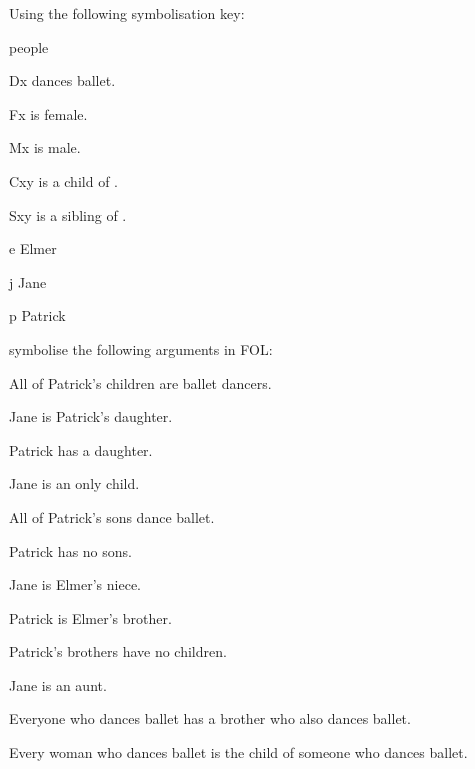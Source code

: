 \problempart
\label{pr.FOLballet}
Using the following symbolisation key:
\begin{ekey}
\item[\text{domain}] people
\item[Dx]  dances ballet.
\item[Fx]  is female.
\item[Mx]  is male.
\item[Cxy]  is a child of .
\item[Sxy]  is a sibling of .
\item[e] Elmer
\item[j] Jane
\item[p] Patrick
\end{ekey}
symbolise the following arguments in FOL:
\begin{earg}
\item All of Patrick's children are ballet dancers.
\item[] 
\item Jane is Patrick's daughter.
\item[] 
\item Patrick has a daughter.
\item[] 
\item Jane is an only child.
\item[] 
\item All of Patrick's sons dance ballet.
\item[] 
\item Patrick has no sons.
\item[] 
\item Jane is Elmer's niece.
\item[] 
\item Patrick is Elmer's brother.
\item[] 
\item Patrick's brothers have no children.
\item[] 
\item Jane is an aunt.
\item[] 
\item Everyone who dances ballet has a brother who also dances ballet.
\item[] 
\item Every woman who dances ballet is the child of someone who dances ballet.
\item[] 
\end{earg}


